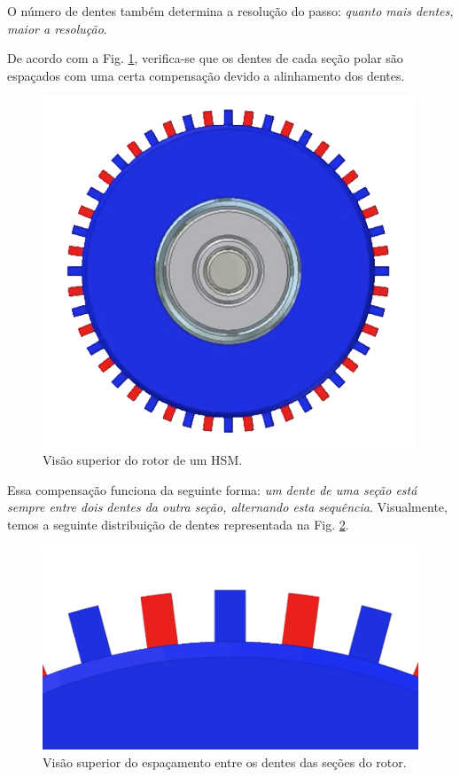 	O número de dentes também determina a resolução do passo: \emph{quanto mais dentes, maior a resolução}.
	
	De acordo com a Fig. \ref{rotor3}, verifica-se que os dentes de cada seção polar são espaçados com uma certa compensação devido a alinhamento dos dentes. 
	
	\begin{figure}[H]
		\centering 
		\includegraphics[scale=0.3]{images/hsm_operation/rotormag3}
		\caption{Visão superior do rotor de um HSM.}
		\label{rotor3}
	\end{figure}
	
	Essa compensação funciona da seguinte forma: \emph{um dente de uma seção está sempre entre dois dentes da outra seção, alternando esta sequência}. Visualmente, temos a seguinte distribuição de dentes representada na Fig. \ref{rotor4}.
	
	\begin{figure}[H]
		\centering 
		\includegraphics[scale=0.2]{images/hsm_operation/rotormag4}
		\caption{Visão superior do espaçamento entre os dentes das seções do rotor.}
		\label{rotor4}
	\end{figure}
	
